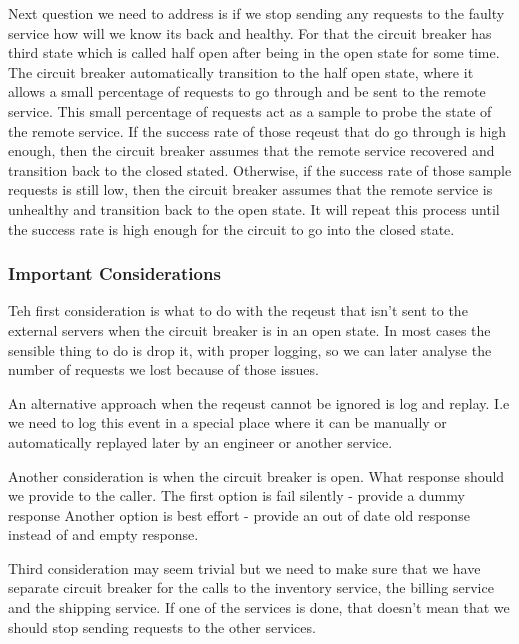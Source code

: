Next question we need to address is if we stop sending any requests to the faulty service how will we know its back and healthy.
For that the circuit breaker has third state which is called half open after being in the open state for some time.
The circuit breaker automatically transition to the half open state, where it allows a small percentage of requests to go through and be sent to the remote service.
This small percentage of requests act as a sample to probe the state of the remote service.
If the success rate of those reqeust that do go through is high enough, then the circuit breaker assumes that the remote service recovered and transition back to the closed stated.
Otherwise, if the success rate of those sample requests is still low, then the circuit breaker assumes that the remote service is unhealthy and transition back to the open state.
It will repeat this process until the success rate is high enough for the circuit to go into the closed state.

\subsubsection{Important Considerations}
Teh first consideration is what to do with the reqeust that isn't sent to the external servers when the circuit breaker is in an open state.
In most cases the sensible thing to do is drop it, with proper logging, so we can later analyse the number of requests we lost because of those issues.

An alternative approach when the reqeust cannot be ignored is log and replay.
I.e we need to log this event in a special place where it can be manually or automatically replayed later by an engineer or another service.

Another consideration is when the circuit breaker is open.
What response should we provide to the caller.
The first option is fail silently - provide a dummy response
Another option is best effort - provide an out of date old response instead of and empty response.

Third consideration may seem trivial but we need to make sure that we have separate circuit breaker for the calls to the inventory service, the billing service and the shipping service.
If one of the services is done, that doesn't mean that we should stop sending requests to the other services.

